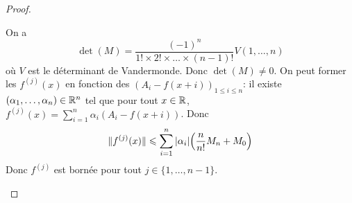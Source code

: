\documentclass[12pt]{article}
\begin{document}
\begin{proof}
\begin{enumerate}
		On a 
		\begin{equation}\det(M)=\frac{(-1)^{n}}{1!\times 2!\times\dots\times (n-1)!}V(1,\dots,n)\end{equation}
		où $V$ est le déterminant de Vandermonde. Donc $\det(M)\neq0$. On peut former les $f^{(j)}(x)$ en fonction des $(A_{i}-f(x+i))_{1\leqslant i\leqslant n}$: il existe $(\alpha_{1},\dots,\alpha_{n})\in\mathbb{R}^{n}$ tel que pour tout $x\in\mathbb{R}$, $f^{(j)}(x)=\sum_{i=1}^{n}\alpha_{i}(A_{i}-f(x+i))$. Donc 
		\begin{equation}\Vert f^{(j)}(x)\Vert\leqslant\sum_{i=1}^{n}\vert\alpha_{i}\vert\Bigl(\frac{n}{n!}M_{n}+M_{0}\Bigr)\end{equation}
		Donc $f^{(j)}$ est bornée pour tout $j\in\{1,\dots,n-1\}$.
	\end{enumerate}
\end{proof}
\end{document}
